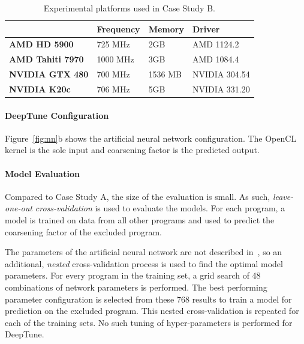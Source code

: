 \begin{table}[t!]
  \centering %
  \begin{tabular}{| l l l l |}
    \hline
    \rowcolor{gray!50}
    & \textbf{Frequency} & \textbf{Memory} & \textbf{Driver} \\
    \hline
    \textbf{AMD HD 5900} & 725 MHz & 2GB & AMD 1124.2 \\
    \textbf{AMD Tahiti 7970} & 1000 MHz & 3GB & AMD 1084.4 \\
    \textbf{NVIDIA GTX 480} & 700 MHz & 1536 MB & NVIDIA 304.54 \\
    \textbf{NVIDIA K20c} & 706 MHz & 5GB & NVIDIA 331.20 \\
    \hline
  \end{tabular}
  \caption[Experimental platforms used in Case Study B]{%
    Experimental platforms used in Case Study B.%
  }
  \label{tab:pact-platforms}
\end{table}


\paragraph*{DeepTune Configuration}

Figure~\ref{fig:nn}b shows the artificial neural network configuration. The OpenCL kernel is the sole input and coarsening factor is the predicted output.

\paragraph*{Model Evaluation}

Compared to Case Study A, the size of the evaluation is small. As such, \emph{leave-one-out cross-validation} is used to evaluate the models. For each program, a model is trained on data from all other programs and used to predict the coarsening factor of the excluded program.

The parameters of the artificial neural network are not described in~\cite{Magni2014}, so an additional, \emph{nested} cross-validation process is used to find the optimal model parameters. For every program in the training set, a grid search of 48 combinations of network parameters is performed. The best performing parameter configuration is selected from these 768 results to train a model for prediction on the excluded program. This nested cross-validation is repeated for each of the training sets. No such tuning of hyper-parameters is performed for DeepTune.


